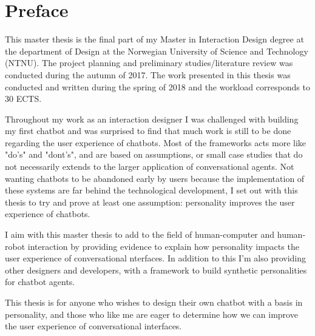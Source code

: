 \hypersetup{pageanchor=false}
%

\chapter*{Preface}
This master thesis is the final part of my Master in Interaction Design degree at the department of Design at the Norwegian University of Science and Technology (NTNU). The project planning and preliminary studies/literature review was conducted during the autumn of 2017. The work presented in this thesis was conducted and written during the spring of 2018 and the workload corresponds to 30 ECTS.

Throughout my work as an interaction designer I was challenged with building my first chatbot and was surprised to find that much work is still to be done regarding the user experience of chatbots. Most of the frameworks acts more like "do's" and "dont's", and are based on assumptions, or small case studies that do not necessarily extends to the larger application of conversational agents. Not wanting chatbots to be abandoned early by users because the implementation of these systems are far behind the technological development, I set out with this thesis to try and prove at least one assumption: personality improves the user experience of chatbots.

I aim with this master thesis to add to the field of human-computer and human-robot interaction by providing evidence to explain how personality impacts the user experience of conversational nterfaces. In addition to this I'm also providing other designers and developers, with a framework to build synthetic personalities for chatbot agents.

This thesis is for anyone who wishes to design their own chatbot with a basis in personality, and those who like me are eager to determine how we can improve the user experience of conversational interfaces.

\vspace{5mm}

\thesisdate \\[1pc]
\\[1pc]
